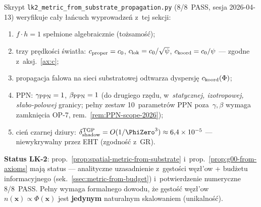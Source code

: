 \begin{remark}%
\label{rem:metric-bridge-numerical}
Skrypt \texttt{lk2\_metric\_from\_substrate\_propagation.py}
(8/8~PASS, sesja 2026-04-13) weryfikuje ca\l{}y \l{}a\'ncuch
wyprowadze\'n z~tej sekcji:
\begin{enumerate}[nosep]
  \item $f\cdot h = 1$ spe\l{}nione algebraicznie (to\.zsamo\'s\'c);
  \item trzy pr\k{e}dko\'sci \'swiat\l{}a: $c_{\rm proper} = c_0$,
    $c_{\rm lok} = c_0/\sqrt\psi$, $c_{\rm koord} = c_0/\psi$
    --- zgodne z~aksj.~\ref{ax:c};
  \item propagacja falowa na sieci substratowej odtwarza
    dyspersj\k{e} $c_{\rm koord}(\Phi)$;
  \item PPN: $\gamma_{\rm PPN} = 1$, $\beta_{\rm PPN} = 1$
    (do drugie\-go rz\k{e}du, w~\emph{statycznej, izotropowej,
    s\l{}abo-po\-low\-ej} granicy; pe\l{}ny zestaw 10~parametr\'ow
    PPN poza~$\gamma,\beta$ wymaga zamkni\k{e}cia OP-7,
    rem.~\ref{rem:PPN-scope-2026});
  \item cie\'n czarnej dziury:
    $\delta_{\rm shadow}^{\rm TGP} = O(1/\PhiZero^3)
    \approx 6{,}4 \times 10^{-5}$ --- niewykrywalny
    przez EHT (zgodno\'s\'c z~GR).
\end{enumerate}
\textbf{Status LK-2}: prop.~\ref{prop:spatial-metric-from-substrate}
i~prop.~\ref{prop:g00-from-axioms} maj\k{a} status
 --- analityczne
uzasadnienie z~g\k{e}sto\'sci w\k{e}z\l{}'ow + bud\.zetu
informacyjnego (sek.~\ref{ssec:metric-from-budget})
i~potwierdzenie numeryczne 8/8~PASS.
Pe\l{}ny  wymaga formalnego dowodu,
\.ze gęsto\'s\'c w\k{e}z\l{}'ow $n(\mathbf{x}) \propto \Phi(\mathbf{x})$
jest \textbf{jedynym} naturalnym skalowaniem (unikalno\'s\'c).
\end{remark}

